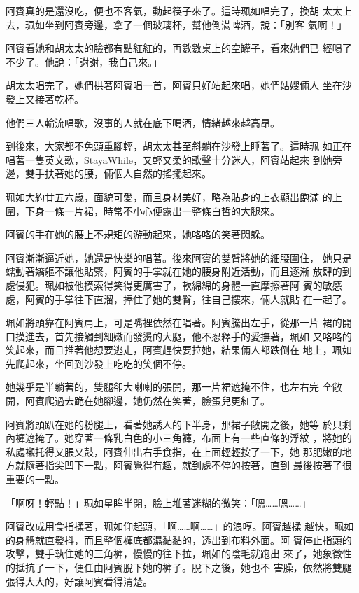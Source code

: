 阿賓真的是還沒吃，便也不客氣，動起筷子來了。這時珮如唱完了，換胡
太太上去，珮如坐到阿賓旁邊，拿了一個玻璃杯，幫他倒滿啤酒，說：「別客
氣啊！」

阿賓看她和胡太太的臉都有點紅紅的，再數數桌上的空罐子，看來她們已
經喝了不少了。他說：「謝謝，我自己來。」

胡太太唱完了，她們拱著阿賓唱一首，阿賓只好站起來唱，她們姑嫂倆人
坐在沙發上又接著乾杯。

他們三人輪流唱歌，沒事的人就在底下喝酒，情緒越來越高昂。

到後來，大家都不免頭重腳輕，胡太太甚至斜躺在沙發上睡著了。這時珮
如正在唱著一隻英文歌，StayaWhile，又輕又柔的歌聲十分迷人，阿賓站起來
到她旁邊，雙手扶著她的腰，倆個人自然的搖擺起來。

珮如大約廿五六歲，面貌可愛，而且身材美好，略為貼身的上衣顯出飽滿
的上圍，下身一條一片裙，時常不小心便露出一整條白皙的大腿來。

阿賓的手在她的腰上不規矩的游動起來，她咯咯的笑著閃躲。

阿賓漸漸逼近她，她還是快樂的唱著。後來阿賓的雙臂將她的細腰圍住，
她只是蠕動著嬌軀不讓他貼緊，阿賓的手掌就在她的腰身附近活動，而且逐漸
放肆的到處侵犯。珮如被他摸索得笑得更厲害了，軟綿綿的身體一直摩擦著阿
賓的敏感處，阿賓的手掌往下直溜，捧住了她的雙臀，往自己摟來，倆人就貼
在一起了。

珮如將頭靠在阿賓肩上，可是嘴裡依然在唱著。阿賓騰出左手，從那一片
裙的開口摸進去，首先接觸到細嫩而發燙的大腿，他不忍釋手的愛撫著，珮如
又咯咯的笑起來，而且推著他想要逃走，阿賓趕快要拉她，結果倆人都跌倒在
地上，珮如先爬起來，坐回到沙發上吃吃的笑個不停。

她幾乎是半躺著的，雙腿卻大喇喇的張開，那一片裙遮掩不住，也左右完
全敞開，阿賓爬過去跪在她腳邊，她仍然在笑著，臉蛋兒更紅了。

阿賓將頭趴在她的粉腿上，看著她誘人的下半身，那裙子敞開之後，她等
於只剩內褲遮掩了。她穿著一條乳白色的小三角褲，布面上有一些直條的浮紋
，將她的私處襯托得又脹又鼓，阿賓伸出右手食指，在上面輕輕按了一下，她
那肥嫩的地方就隨著指尖凹下一點，阿賓覺得有趣，就到處不停的按著，直到
最後按著了很重要的一點。

「啊呀！輕點！」珮如星眸半閉，臉上堆著迷糊的微笑：「嗯……嗯……」

阿賓改成用食指揉著，珮如仰起頭，「啊……啊……」的浪哼。阿賓越揉
越快，珮如的身體就直發抖，而且整個褲底都濕黏黏的，透出到布料外面。阿
賓停止指頭的攻擊，雙手執住她的三角褲，慢慢的往下拉，珮如的陰毛就跑出
來了，她象徵性的抵抗了一下，便任由阿賓脫下她的褲子。脫下之後，她也不
害臊，依然將雙腿張得大大的，好讓阿賓看得清楚。

